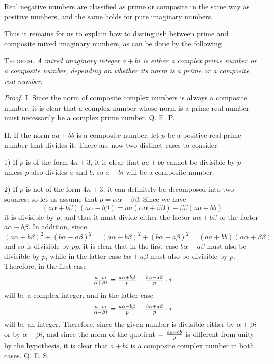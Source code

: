 \documentclass[twoside,12pt]{memoir}
\let\oldfrac\frac
\def\frac#1#2{\mathchoice{\tfrac{#1}{#2}}{\oldfrac{#1}{#2}}{\genfrac{}{}{}{2}{#1}{#2\mathstrut}}{\genfrac{}{}{}{3}{#1}{#2\mathstrut}}}
\begin{document}
Real negative numbers are classified as prime or composite in the same way as positive numbers, and the same holds for pure imaginary numbers.

Thus it remains for us to explain how to distinguish between prime and composite mixed imaginary numbers, as can be done by the following

\textsc{Theorem.} \textit{A mixed imaginary integer \(a+b i\) is either a complex prime number or a composite number, depending on whether its norm is a prime or a composite real number.}

\textit{Proof.} I. Since the norm of composite complex numbers is always a composite number, it is clear that a complex number whose norm is a prime real number must necessarily be a complex prime number. Q. E. P.

II. If the norm \(a a+b b\) is a composite number, let \(p\) be a positive real prime number that divides it. There are now two distinct cases to consider.

1) If \(p\) is of the form \(4 n+3\), it is clear that \(a a+b b\) cannot be divisible by \(p\) unless \(p\) also divides \(a\) and \(b\), so \(a+b i\) will be a composite number.

2) If \(p\) is not of the form \(4 n+3\), it can definitely be decomposed into two squares: so let us assume that \(p=\alpha \alpha+\beta \beta\). Since we have
\[(a \alpha+b \beta)(a \alpha-b \beta)=a a(\alpha \alpha+\beta \beta)-\beta \beta(a a+b b)\]
it is divisible by \(p\), and thus it must divide either the factor \(a \alpha+b \beta\) or the factor \(a \alpha-b \beta\). In addition, since
\[(a \alpha+b \beta)^{2}+(b \alpha-a \beta)^{2}=(a \alpha-b \beta)^{2}+(b \alpha+a \beta)^{2}=(a a+b b)(\alpha \alpha+\beta \beta)\]
and so is divisible by \(p p\), it is clear that in the first case \(b \alpha-a \beta\) must also be divisible by \(p\), while in the latter case \(b \alpha+a \beta\) must also be divisible by \(p\). Therefore, in the first case
\[\frac{a+b i}{\alpha+\beta i}=\frac{a \alpha+b \beta}{p}+\frac{b \alpha-a \beta}{p} \cdot i\]
will be a complex integer, and in the latter case
\[\frac{a+b i}{\alpha-\beta i}=\frac{a \alpha-b \beta}{p}+\frac{b \alpha+a \beta}{p} \cdot i\]
will be an integer. Therefore, since the given number is divisible either by \(\alpha+\beta i\) or by \(\alpha-\beta i\), and since the norm of the quotient \(=\frac{a a+b b}{p}\) is different from unity by the hypothesis, it is clear that \(a+b i\) is a composite complex number in both cases. Q. E. S.
%
\end{document}

